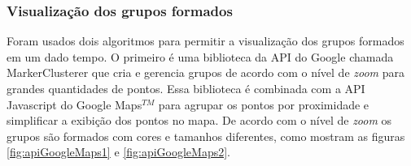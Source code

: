 \subsubsection{Visualização dos grupos formados}
Foram usados dois algoritmos para permitir a visualização dos grupos formados em um dado tempo.
O primeiro é uma biblioteca da API do Google chamada MarkerClusterer \cite{markerCluster} que cria e gerencia grupos de acordo com o nível de \textit{zoom} para grandes quantidades de pontos.
Essa biblioteca é combinada com a API Javascript do Google Maps$^{TM}$ para agrupar os pontos por proximidade e simplificar a exibição dos pontos no mapa.
De acordo com o nível de \textit{zoom} os grupos são formados com cores e tamanhos diferentes, como mostram as figuras \ref{fig:apiGoogleMaps1} e \ref{fig:apiGoogleMaps2}.
\begin{figure}[!ht]
	\centering	
\end{figure}
\FloatBarrier

\begin{figure}[!ht]
	\centering	
\end{figure}
\FloatBarrier


